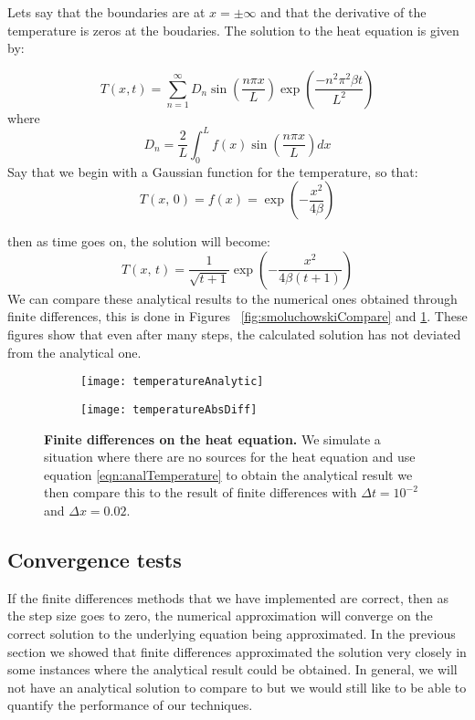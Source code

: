 Lets say that the boundaries are at $x = \pm \infty$ and that the derivative of the temperature is zeros at the boudaries. The solution to the heat equation is given by:

\begin{equation}
T(x, t) = \sum_{n=1}^\infty D_n \sin \left(\frac{n \pi x}{L} \right) \exp\left(\frac{-n^2 \pi^2 \beta t}{L^2}\right)  \label{eqn:analTemperature}
\end{equation}
where
\begin{equation}
D_n = \frac{2}{L} \int_0^L f(x) \sin \left(\frac{n \pi x}{L} \right) dx
\end{equation}
Say that we begin with a Gaussian function for the temperature, so that:
\begin{equation}
T(x, \, 0) = f(x) =  \exp{\left (-\frac{x^2}{4 \beta} \right)}
\end{equation}

then as time goes on, the solution will become:
\begin{equation}
T(x, \, t) = \frac{1}{\sqrt{t + 1}} \exp{ \left(-\frac{x^2}{4 \beta (t + 1)} \right)}
\end{equation}
We can compare these analytical results to the numerical ones obtained through finite differences, this is done in Figures ~\ref{fig:smoluchowskiCompare} and \ref{fig:temperatureCompare}. These figures show that even after many steps, the calculated solution has not deviated from the analytical one.

\begin{figure}
	\begin{subfigure}{0.49\textwidth}
	\texttt{[image: temperatureAnalytic]}
	\end{subfigure}
	\begin{subfigure}{0.49\textwidth}
	\texttt{[image: temperatureAbsDiff]}
	\end{subfigure}
	\caption{\textbf{Finite differences on the heat equation.} We simulate a situation where there are no sources for the heat equation and use equation \ref{eqn:analTemperature} to obtain the analytical result we then compare this to the result of finite differences with $\Delta t = 10^{-2}$ and $\Delta x = 0.02$. \label{fig:temperatureCompare}}
\end{figure}

\subsection{Convergence tests}
If the finite differences methods that we have implemented are correct, then as the step size goes to zero, the numerical approximation will converge on the correct solution to the underlying equation being approximated. In the previous section we showed that finite differences approximated the solution very closely in some instances where the analytical result could be obtained. In general, we will not have an analytical solution to compare to but we would still like to be able to quantify the performance of our techniques.

